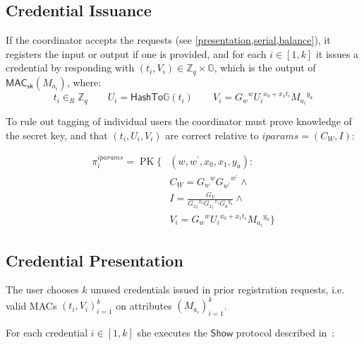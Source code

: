 \documentclass[a4paper]{article}
\begin{document}
\subsection{Credential Issuance}

If the coordinator accepts the requests (see \cref{presentation,serial,balance}), it registers the input or output if one is provided, and for each $i \in [1,k]$ it issues a credential by responding with
$(t_i, V_i) \in \mathbb{Z}_q \times \mathbb{G}$,
which is the output of
$\mathsf{MAC}_{\mathsf{sk}}(M_{a_i})$,
where:
\[
  t_i \in_{R} \mathbb{Z}_{q}
  \qquad
  U_i = \mathsf{HashTo\mathbb{G}}(t_i)
  \qquad
  V_i={G_w}^{w} {U_i}^{x_{0}+x_{1} t_i}{M_{a_i}}^{y_a}
\]


To rule out tagging of individual users the coordinator must prove knowledge of the secret key, and that $(t_i, U_i, V_i)$ are correct relative to $\mathit{iparams}=(C_{W}, I)$:

\begin{align*}
  \pi_{i}^{\mathit{iparams}}=\operatorname{PK}\{ & (w, w^{\prime}, x_{0}, x_{1}, y_a): \\
                                                 &C_{W}={G_{w}}^{w} {G_{w^{\prime}}}^{w^\prime} \land \\
                                                 &I=\frac{G_{V}}{{G_{x_{0}}}^{x_0} {G_{x_1}}^{x_1} {G_a}^{y_a}}  \land \\
                                                 &V_i={G_w}^{w}{U_i}^{x_{0}+x_{1}t_i} {M_{a_i}}^{y_a}
                                                   \}
\end{align*}

\subsection{Credential Presentation}\label{presentation}

The user chooses $k$ unused credentials issued in prior registration requests, i.e. valid MACs $(t_i,V_i)_{i=1}^k$ on attributes $(M_{a_i})_{i=1}^k$.

For each credential $i \in [1, k]$ she executes the $\mathsf{Show}$ protocol described in~\cite{chase2019signal}:
\end{document}
